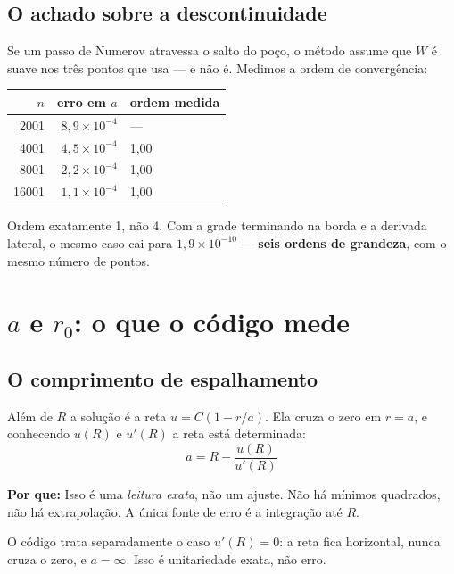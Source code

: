 \documentclass[11pt,a4paper]{article}
\newcommand{\pq}[1]{\medskip\noindent\textbf{Por que:} #1\medskip}
\begin{document}
\subsection*{O achado sobre a descontinuidade}

Se um passo de Numerov atravessa o salto do poço, o método assume que $W$ é suave
nos três pontos que usa --- e não é. Medimos a ordem de convergência:

\begin{center}
\begin{tabular}{rrl}
\toprule
$n$ & erro em $a$ & ordem medida \\
\midrule
2001  & $8{,}9\times10^{-4}$ & --- \\
4001  & $4{,}5\times10^{-4}$ & 1{,}00 \\
8001  & $2{,}2\times10^{-4}$ & 1{,}00 \\
16001 & $1{,}1\times10^{-4}$ & 1{,}00 \\
\bottomrule
\end{tabular}
\end{center}

Ordem exatamente 1, não 4. Com a grade terminando na borda e a derivada lateral,
o mesmo caso cai para $1{,}9\times10^{-10}$ --- \textbf{seis ordens de grandeza},
com o mesmo número de pontos.

\section{$a$ e $r_0$: o que o código mede}

\subsection{O comprimento de espalhamento}

Além de $R$ a solução é a reta $u = C(1 - r/a)$. Ela cruza o zero em $r=a$, e
conhecendo $u(R)$ e $u'(R)$ a reta está determinada:
\begin{equation}
  \boxed{\;a = R - \frac{u(R)}{u'(R)}\;}
\end{equation}

\pq{Isso é uma \emph{leitura exata}, não um ajuste. Não há mínimos quadrados,
não há extrapolação. A única fonte de erro é a integração até $R$.}

O código trata separadamente o caso $u'(R)=0$: a reta fica horizontal, nunca
cruza o zero, e $a = \infty$. Isso é unitariedade exata, não erro.
\end{document}

